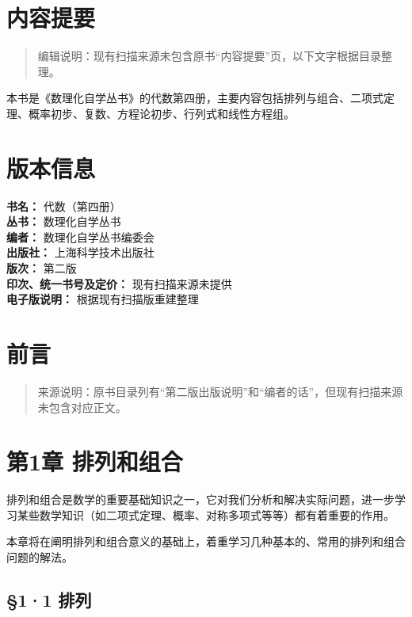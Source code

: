 \chapter*{内容提要}

\begin{quote}
编辑说明：现有扫描来源未包含原书``内容提要''页，以下文字根据目录整理。
\end{quote}

本书是《数理化自学丛书》的代数第四册，主要内容包括排列与组合、二项式定理、概率初步、复数、方程论初步、行列式和线性方程组。

\chapter*{版本信息}

\begin{flushleft}
\textbf{书名：} 代数（第四册）\\
\textbf{丛书：} 数理化自学丛书\\
\textbf{编者：} 数理化自学丛书编委会\\
\textbf{出版社：} 上海科学技术出版社\\
\textbf{版次：} 第二版\\
\textbf{印次、统一书号及定价：} 现有扫描来源未提供\\
\textbf{电子版说明：} 根据现有扫描版重建整理
\end{flushleft}

\chapter{前言}

\begin{quote}
来源说明：原书目录列有``第二版出版说明''和``编者的话''，但现有扫描来源未包含对应正文。
\end{quote}

\chapter{第1章 排列和组合}

排列和组合是数学的重要基础知识之一，它对我们分析和解决实际问题，进一步学习某些数学知识（如二项式定理、概率、对称多项式等等）都有着重要的作用。

本章将在阐明排列和组合意义的基础上，着重学习几种基本的、常用的排列和组合问题的解法。

\section{§1·1 排列}

